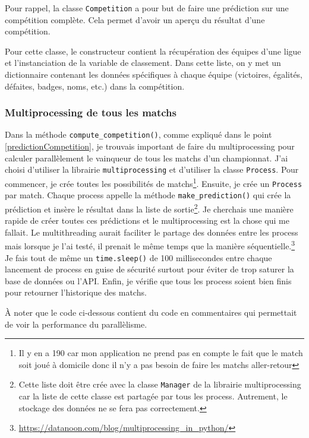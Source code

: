 \documentclass[a4paper,14pt]{extarticle}
\begin{document}
{Pour rappel, la classe \texttt{Competition} a pour but de faire une prédiction sur une compétition complète. Cela permet d'avoir un aperçu du résultat d'une compétition.

Pour cette classe, le constructeur contient la récupération des équipes d'une ligue et l'instanciation de la variable de classement. Dans cette liste, on y met un dictionnaire contenant les données spécifiques à chaque équipe (victoires, égalités, défaites, badges, noms, etc.) dans la compétition.


\subsubsection{Multiprocessing de tous les matchs}

Dans la méthode \texttt{compute\_competition()}, comme expliqué dans le point \ref{predictionCompetition}, je trouvais important de faire du multiprocessing pour calculer parallèlement le vainqueur de tous les matchs d'un championnat. J'ai choisi d'utiliser la librairie \texttt{multiprocessing} et d'utiliser la classe \texttt{Process}.
Pour commencer, je crée toutes les possibilités de matchs\footnote{Il y en a 190 car mon application ne prend pas en compte le fait que le match soit joué à domicile donc il n'y a pas besoin de faire les matchs aller-retour}. Ensuite, je crée un \texttt{Process} par match. Chaque process appelle la méthode \texttt{make\_prediction()} qui crée la prédiction et insère le résultat dans la liste de sortie\footnote{Cette liste doit être crée avec la classe \texttt{Manager} de la librairie multiprocessing car la liste de cette classe est partagée par tous les process. Autrement, le stockage des données ne se fera pas correctement.}. Je cherchais une manière rapide de créer toutes ces prédictions et le multiprocessing est la chose qui me fallait. Le multithreading aurait faciliter le partage des données entre les process mais lorsque je l'ai testé, il prenait le même temps que la manière séquentielle.\footnote{\url{https://datanoon.com/blog/multiprocessing_in_python/}}
Je fais tout de même un \texttt{time.sleep()} de 100 millisecondes entre chaque lancement de process en guise de sécurité surtout pour éviter de trop saturer la base de données ou l'API.
Enfin, je vérifie que tous les process soient bien finis pour retourner l'historique des matchs.

À noter que le code ci-dessous contient du code en commentaires qui permettait de voir la performance du parallèlisme.

}
\end{document}
